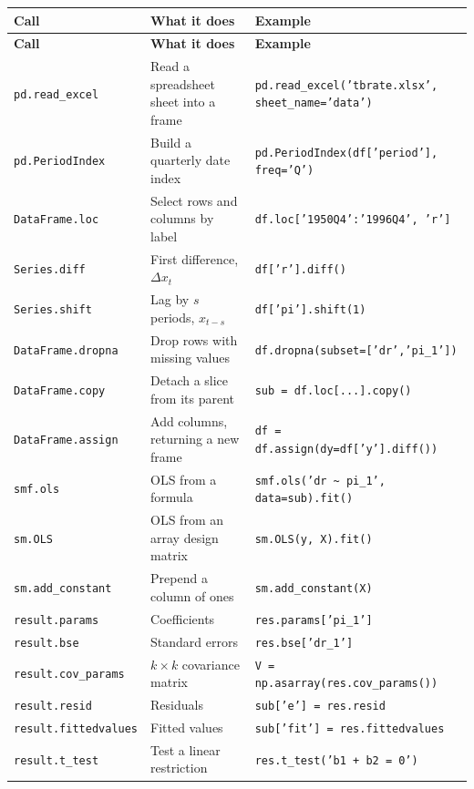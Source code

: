 \documentclass[11pt]{article}
\newcommand{\code}[1]{\texttt{#1}}
\begin{document}
\begin{center}
\begin{longtable}{@{}p{4.2cm}p{4.8cm}p{6.5cm}@{}}
\toprule
\textbf{Call} & \textbf{What it does} & \textbf{Example} \\
\midrule
\endfirsthead
\toprule
\textbf{Call} & \textbf{What it does} & \textbf{Example} \\
\midrule
\endhead
\code{pd.read\_excel} & Read a spreadsheet sheet into a frame & \code{pd.read\_excel('tbrate.xlsx', sheet\_name='data')} \\
\code{pd.PeriodIndex} & Build a quarterly date index & \code{pd.PeriodIndex(df['period'], freq='Q')} \\
\code{DataFrame.loc} & Select rows and columns by label & \code{df.loc['1950Q4':'1996Q4', 'r']} \\
\code{Series.diff} & First difference, $\Delta x_t$ & \code{df['r'].diff()} \\
\code{Series.shift} & Lag by $s$ periods, $x_{t-s}$ & \code{df['pi'].shift(1)} \\
\code{DataFrame.dropna} & Drop rows with missing values & \code{df.dropna(subset=['dr','pi\_1'])} \\
\code{DataFrame.copy} & Detach a slice from its parent & \code{sub = df.loc[...].copy()} \\
\code{DataFrame.assign} & Add columns, returning a new frame & \code{df = df.assign(dy=df['y'].diff())} \\
\code{smf.ols} & OLS from a formula & \code{smf.ols('dr \textasciitilde\ pi\_1', data=sub).fit()} \\
\code{sm.OLS} & OLS from an array design matrix & \code{sm.OLS(y, X).fit()} \\
\code{sm.add\_constant} & Prepend a column of ones & \code{sm.add\_constant(X)} \\
\code{result.params} & Coefficients & \code{res.params['pi\_1']} \\
\code{result.bse} & Standard errors & \code{res.bse['dr\_1']} \\
\code{result.cov\_params} & $k \times k$ covariance matrix & \code{V = np.asarray(res.cov\_params())} \\
\code{result.resid} & Residuals & \code{sub['e'] = res.resid} \\
\code{result.fittedvalues} & Fitted values & \code{sub['fit'] = res.fittedvalues} \\
\code{result.t\_test} & Test a linear restriction & \code{res.t\_test('b1 + b2 = 0')} \\

\end{longtable}
\end{center}
\end{document}
